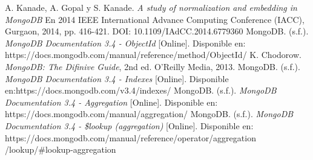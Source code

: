 \documentclass[conference,compsoc]{sty/IEEEtran}
\begin{document}
\begin{thebibliography}{1}
A. Kanade, A. Gopal y S. Kanade. \emph{A study of normalization and embedding in MongoDB} En 2014 IEEE International Advance Computing Conference (IACC), Gurgaon, 2014, pp. 416-421. DOI: 10.1109/IAdCC.2014.6779360
MongoDB. (s.f.). \emph{MongoDB Documentation 3.4 - ObjectId} [Online]. Disponible en: https://docs.mongodb.com/manual/reference/method/ObjectId/
K. Chodorow. \emph{MongoDB: The Difinive Guide}, 2nd ed. O'Reilly Media, 2013.
MongoDB. (s.f.). \emph{MongoDB Documentation 3.4 - Indexes} [Online]. Disponible en:https://docs.mongodb.com/v3.4/indexes/
MongoDB. (s.f.). \emph{MongoDB Documentation 3.4 - Aggregation} [Online]. Disponible en: https://docs.mongodb.com/manual/aggregation/
MongoDB. (s.f.). \emph{MongoDB Documentation 3.4 - \$lookup (aggregation)} [Online]. Disponible en: https://docs.mongodb.com/manual/reference/operator/aggregation
/lookup/\#lookup-aggregation 

\end{thebibliography}
\end{document}
